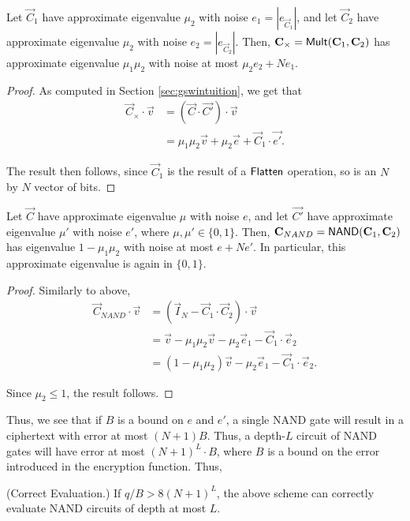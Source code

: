     \begin{lemma}
        Let $\vec{C}_1$ have approximate eigenvalue $\mu_2$ with noise $e_1 = |e_{\vec{C}_1}|$, and let $\vec{C}_2$ have approximate eigenvalue $\mu_2$ with noise $e_2 = |e_{\vec{C}_2}|$. Then, $\vec{C}_\times = {\sf Mult}(\vec{C}_1, \vec{C}_2)$ has approximate eigenvalue
        $\mu_1 \mu_2$ with noise at most $\mu_2 e_2 + N e_1$.
    \end{lemma}
    \begin{proof}
        As computed in Section \ref{sec:gswintuition}, we get that
        \begin{align*}
            \vec{C}_\times \cdot \vec{v} &= (\vec{C} \cdot \vec{C'}) \cdot \vec{v} \\
            &= \mu_1 \mu_2 \vec{v} + \mu_2 \vec{e} + \vec{C}_1 \cdot \vec{e'}.
        \end{align*}

        The result then follows, since $\vec{C}_1$ is the result of a ${\sf Flatten}$ operation, so is an $N$ by $N$ vector of bits.

    \end{proof}


    \begin{lemma}
        Let $\vec{C}$ have approximate eigenvalue $\mu$ with noise $e$, and let $\vec{C'}$ have approximate eigenvalue $\mu'$ with noise $e'$, where $\mu, \mu' \in \{0, 1\}$. Then, $\vec{C}_{NAND} = {\sf NAND}(\vec{C}_1, \vec{C}_2)$ has eigenvalue $1 - \mu_1 \mu_2$ with noise at most $e + N e'$. In particular, this approximate eigenvalue is again in $\{0,1\}$.
    \end{lemma}
    \begin{proof}
        Similarly to above,
        \begin{align*}
            \vec{C}_{NAND} \cdot \vec{v} &= (\vec{I}_N - \vec{C}_1 \cdot \vec{C}_2) \cdot \vec{v} \\
            &= \vec{v} - \mu_1 \mu_2 \vec{v} - \mu_2 \vec{e}_1 - \vec{C}_1 \cdot \vec{e}_2 \\
            &= (1 - \mu_1 \mu_2) \vec{v} - \mu_2 \vec{e}_1 - \vec{C}_1 \cdot \vec{e}_2.
        \end{align*}

        Since $\mu_2 \leq 1$, the result follows.
    \end{proof}

    Thus, we see that if $B$ is a bound on $e$ and $e'$, a single NAND gate will result in a ciphertext with error at most $(N+1)B$. Thus, a depth-$L$ circuit of NAND gates will have error at most $(N+1)^L \cdot B$, where $B$ is a bound on the error introduced in the encryption function. Thus,
    \begin{theorem} (Correct Evaluation.)
        If $q / B > 8 (N+1)^L$, the above scheme can correctly evaluate NAND circuits of depth at most $L$.
    \end{theorem}

